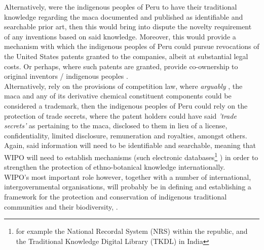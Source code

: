 \documentclass[11pt]{article}
\begin{document}
Alternatively, were the indigenous peoples of Peru to have their traditional
knowledge regarding the maca documented and published as identifiable and
searchable prior art, then this would bring into dispute the novelty requirement
of any inventions based on said knowledge. Moreover, this would provide a
mechanism with which the indigenous peoples of Peru could pursue revocations of
the United States patents granted to the companies, albeit at substantial legal
costs. Or perhaps, where such patents are granted, provide co-ownership to
original inventors / indigenous peoples \cite{amechi15_leverag_trad_knowl_medicinal}.\\

Alternatively, rely on the provisions of competition law, where \emph{arguably}
\cite{masango10_indigenous_trad_knowl_protect_prospects}, the maca and any of its
derivative chemical constituent components could be considered a trademark, then
the indigenous peoples of Peru could rely on the protection of trade secrets,
where the patent holders could have said \emph{'trade secrets'} as pertaining to the
maca, disclosed to them in lieu of a license, confidentiality, limited
disclosure, remuneration and royalties, amongst others. Again, said information
will need to be identifiable and searchable, meaning that WIPO will need to
establish mechanisms (such electronic databases\footnote{for example the National
Recordal System (NRS) within the republic, and the Traditional Knowledge Digital
Library (TKDL) in India} \cite{amechi15_leverag_trad_knowl_medicinal}) in order to
strengthen the protection of ethno-botanical knowledge internationally.\\

WIPO's most important role however, together with a number of international,
intergovernmental organisations, will probably be in defining and establishing a
framework for the protection and conservation of indigenous traditional
communities and their biodiversity, \cite{simelane09_african_trad_knowl_sys_biodiv_manag}.
\printbibliography
\end{document}
